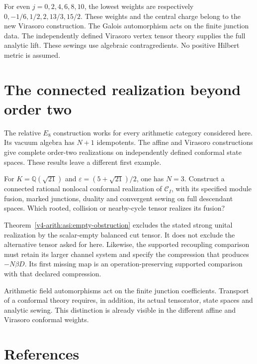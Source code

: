 For even $j=0,2,4,6,8,10$, the lowest weights are respectively
$0,-1/6,1/2,2,13/3,15/2$. These weights and the central charge belong
to the new Virasoro construction. The Galois
automorphism acts on the finite junction data. The independently
defined Virasoro vertex tensor theory supplies the full analytic lift.
These sewings use algebraic contragredients. No positive Hilbert
metric is assumed.

\section{The connected realization beyond order two}
\label{v4-arith:asi:connected-question}

The relative \(E_8\) construction works for every arithmetic category
considered here. Its vacuum algebra has \(N+1\) idempotents.
The affine and Virasoro constructions give complete order-two
realizations on independently defined conformal state spaces.
These results leave a different first example.

\begin{question}\label{v4-arith:asi:order-three}
For \(K=\mathbb Q(\sqrt{21})\) and
\(\varepsilon=(5+\sqrt{21})/2\), one has \(N=3\).
Construct a connected rational nonlocal conformal realization of
\(\mathcal C_I\), with its specified module fusion, marked junctions,
duality and convergent sewing on full descendant spaces.
Which rooted, collision or nearby-cycle tensor realizes its fusion?
\end{question}

Theorem~\ref{v4-arith:asi:empty-obstruction} excludes the stated
strong unital realization by the scalar-empty balanced cut tensor.
It does not exclude the alternative tensor asked for here.
Likewise, the supported recoupling comparison must retain its larger
channel system and specify the compression that produces
\(-N\beta D\). Its first missing map is an operation-preserving
supported comparison with that declared compression.

Arithmetic field automorphisms act on the finite junction
coefficients. Transport of a conformal theory requires, in addition,
its actual tensorator, state spaces and analytic sewing.
This distinction is already visible in the different affine and
Virasoro conformal weights.

\section{References}

